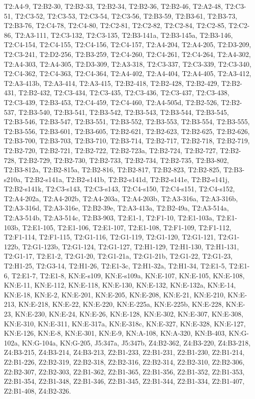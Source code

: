 {\footnotesize T2:A4-9, T2:B2-30, T2:B2-33, T2:B2-34, T2:B2-36, T2:B2-46, T2:A2-48, T2:C3-51, T2:C3-52, T2:C3-53, T2:C3-54, T2:C3-56, T2:B3-59, T2:B3-61, T2:B3-73, T2:B3-76, T2:C4-78, T2:C4-80, T2:C2-81, T2:C2-82, T2:C2-84, T2:C2-85, T2:C2-86, T2:A3-111, T2:C3-132, T2:C3-135, T2:B3-141a, T2:B3-145a, T2:B3-146, T2:C4-154, T2:C4-155, T2:C4-156, T2:C4-157, T2:A4-204, T2:A4-205, T2:D3-209, T2:C3-241, T2:D2-256, T2:B3-259, T2:C4-260, T2:C4-261, T2:C4-264, T2:A4-302, T2:A4-303, T2:A4-305, T2:D3-309, T2:A3-318, T2:C3-337, T2:C3-339, T2:C3-340, T2:C4-362, T2:C4-363, T2:C4-364, T2:A4-402, T2:A4-404, T2:A4-405, T2:A3-412, T2:A3-413b, T2:A3-414, T2:A3-415, T2:B2-418, T2:B2-428, T2:B2-429, T2:B2-431, T2:B2-432, T2:C3-434, T2:C3-435, T2:C3-436, T2:C3-437, T2:C3-438, T2:C3-439, T2:B3-453, T2:C4-459, T2:C4-460, T2:A4-505d, T2:B2-526, T2:B2-537, T2:B3-540, T2:B3-541, T2:B3-542, T2:B3-543, T2:B3-544, T2:B3-545, T2:B3-546, T2:B3-547, T2:B3-551, T2:B3-552, T2:B3-553, T2:B3-554, T2:B3-555, T2:B3-556, T2:B3-601, T2:B3-605, T2:B2-621, T2:B2-623, T2:B2-625, T2:B2-626, T2:B3-700, T2:B3-703, T2:B3-710, T2:B3-714, T2:B2-717, T2:B2-718, T2:B2-719, T2:B2-720, T2:B2-721, T2:B2-722, T2:B2-723a, T2:B2-724, T2:B2-727, T2:B2-728, T2:B2-729, T2:B2-730, T2:B2-733, T2:B2-734, T2:B2-735, T2:B3-802, T2:B3-812a, T2:B2-815a, T2:B2-816, T2:B2-817, T2:B2-823, T2:B2-825, T2:B3-s210a, T2:B2-s141a, T2:B2-s141b, T2:B2-s141d, T2:B2-s141e, T2:B2-s141j, T2:B2-s141k, T2:C3-s143, T2:C3-s143, T2:C4-s150, T2:C4-s151, T2:C4-s152, T2:A4-202a, T2:A4-202b, T2:A4-203a, T2:A4-203b, T2:A3-316a, T2:A3-316b, T2:A3-316d, T2:A3-316e, T2:B2-39e, T2:A3-413a, T2:B2-49a, T2:A3-514a, T2:A3-514b, T2:A3-514c, T2:B3-903, T2:E1-1, T2:F1-10, T2:E1-103a, T2:E1-103b, T2:E1-105, T2:E1-106, T2:E1-107, T2:E1-108, T2:F1-109, T2:F1-112, T2:F1-114, T2:F1-115, T2:G1-116, T2:G1-119, T2:G1-120, T2:G1-121, T2:G1-122b, T2:G1-123b, T2:G1-124, T2:G1-127, T2:H1-129, T2:H1-130, T2:H1-131, T2:G1-17, T2:E1-2, T2:G1-20, T2:G1-21a, T2:G1-21b, T2:G1-22, T2:G1-23, T2:H1-25, T2:G3-14, T2:H1-26, T2:E1-3c, T2:H1-32a, T2:H1-34, T2:E1-5, T2:E1-6, T2:E1-7, T2:E1-8, KN:E-s109, KN:E-s109a, KN:E-107, KN:E-105, KN:E-108, KN:E-11, KN:E-112, KN:E-118, KN:E-130, KN:E-132, KN:E-132a, KN:E-14, KN:E-18, KN:E-2, KN:E-201, KN:E-205, KN:E-208, KN:E-21, KN:E-210, KN:E-213, KN:E-218, KN:E-22, KN:E-220, KN:E-225a, KN:E-225b, KN:E-228, KN:E-23, KN:E-230, KN:E-24, KN:E-26, KN:E-128, KN:E-302, KN:E-307, KN:E-308, KN:E-310, KN:E-311, KN:E-317a, KN:E-318c, KN:E-327, KN:E-328, KN:E-127, KN:E-126, KN:E-8, KN:E-301, KN:E-9, KN:A-108, KN:A-320, KN:B-403, KN:G-102a, KN:G-104a, KN:G-205, J5:347a, J5:347b, Z4:B2-362, Z4:B3-220, Z4:B3-218, Z4:B3-215, Z4:B3-214, Z4:B3-213, Z2:B1-233, Z2:B1-231, Z2:B1-230, Z2:B1-214, Z2:B1-226, Z2:B2-319, Z2:B2-318, Z2:B2-316, Z2:B2-314, Z2:B2-310, Z2:B2-306, Z2:B2-307, Z2:B2-303, Z2:B1-362, Z2:B1-365, Z2:B1-356, Z2:B1-352, Z2:B1-353, Z2:B1-354, Z2:B1-348, Z2:B1-346, Z2:B1-345, Z2:B1-344, Z2:B1-334, Z2:B1-407, Z2:B1-408, Z4:B2-326.}

